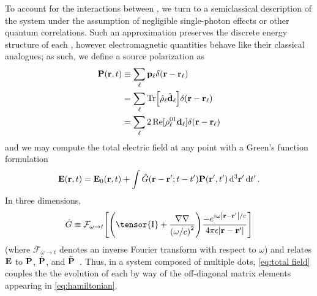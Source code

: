 To account for the interactions between \qds{}, we turn to a semiclassical description of the system under the assumption of negligible single-photon effects or other quantum correlations.
Such an approximation preserves the discrete energy structure of each \qd{}, however electromagnetic quantities behave like their classical analogues;
as such, we define a source polarization as
\begin{equation}
  \begin{aligned}
    \vb{P}(\vb{r}, t) &\equiv \sum_\ell \vb{p}_\ell \delta(\vb{r} - \vb{r}_\ell) \\
                      &= \sum_\ell \Tr[\hat{\rho}_\ell \hat{\vb{d}}_\ell] \delta(\vb{r} - \vb{r}_\ell) \\
                      &= \sum_\ell 2 \Re[\rho_\ell^{01}\vb{d}_\ell]\delta(\vb{r} - \vb{r}_\ell) \\
  \end{aligned}
\end{equation}
and we may compute the total electric field at any point with a Green's function formulation
\begin{equation}
  \vb{E}(\vb{r}, t) = \vb{E}_0(\vb{r}, t) + \int \hat{G}(\vb{r} - \vb{r}'; t - t')\vb{P}(\vb{r}', t') \dd[3]{\vb{r}'} \dd{t'}.
  \label{eq:total field}
\end{equation}
In three dimensions,
\begin{equation}
  \hat{G} \equiv \mathcal{F}_{\omega \to t}\qty[ \qty(\tensor{\mathrm{I}} + \frac{\nabla \nabla}{\qty(\omega/c)^2})\frac{-e^{i \omega \abs{\vb{r} - \vb{r}'}/c}}{4\pi \epsilon \abs{\vb{r} - \vb{r}'}} ]
  \label{eq:dyadic}
\end{equation}
(where $\mathcal{F}_{\omega \to t}$ denotes an inverse Fourier transform with respect to $\omega$) and relates $\vb{E}$ to $\vb{P}$, $\dot{\vb{P}}$, and $\ddot{\vb{P}}$~\cite{Rothwell2009}.
Thus, in a system composed of multiple dots, \cref{eq:total field} couples the the evolution of each \qd{} by way of the off-diagonal matrix elements appearing in \cref{eq:hamiltonian}.
